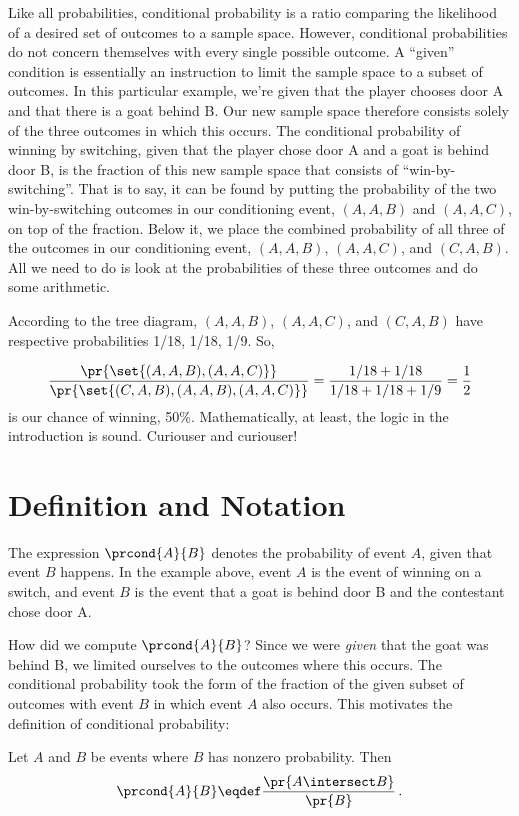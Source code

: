 Like all probabilities, conditional probability is a ratio comparing
the likelihood of a desired set of outcomes to a sample space.
However, conditional probabilities do not concern themselves with
every single possible outcome.  A ``given'' condition is essentially
an instruction to limit the sample space to a subset of outcomes.  In
this particular example, we're given that the player chooses door A
and that there is a goat behind B.  Our new sample space therefore
consists solely of the three outcomes in which this occurs.  The
conditional probability of winning by switching, given that the player
chose door A and a goat is behind door B, is the fraction of this new
sample space that consists of ``win-by-switching''.  That is to say,
it can be found by putting the probability of the two win-by-switching
outcomes in our conditioning event, $(A, A, B)$ and $(A, A, C)$, on
top of the fraction.  Below it, we place the combined probability of
all three of the outcomes in our conditioning event, $(A, A, B)$, $(A,
A, C)$, and $(C, A, B)$.  All we need to do is look at the
probabilities of these three outcomes and do some arithmetic.

According to the tree diagram, $(A, A, B)$, $(A, A, C)$, and $(C, A,
B)$ have respective probabilities 1/18, 1/18, 1/9. So,

\iffalse
A Monty Hall game has a
\[
\frac{1}{18} + \frac{1}{18} + \frac{1}{9} = \frac{2}{9}
\]
chance of ending in one of these outcomes.  This 2/9 fraction is all
we need; we can ignore all other outcomes on the tree.
\fi
\[ 
\frac{\pr{\set{(A, A, B),(A, A, C)}}}{\pr{\set{(C, A, B),(A, A,
    B),(A, A, C)}}} = \frac{1/18 + 1/18}{1/18 + 1/18 + 1/9}=\frac{1}{2}
\]
is our chance of winning, 50\%.  Mathematically, at least, the
logic in the introduction is sound.  Curiouser and curiouser!

\section{Definition and Notation}

The expression $\prcond{A}{B}$ denotes the probability of event $A$,
given that event $B$ happens.  In the example above, event $A$ is the
event of winning on a switch, and event $B$ is the event that a goat
is behind door B and the contestant chose door A.

How did we compute $\prcond{A}{B}$?  Since we were \emph{given} that
the goat was behind B, we limited ourselves to the outcomes where this
occurs.  The conditional probability took the form of the fraction of
the given subset of outcomes with event $B$ in which event $A$ also
occurs.  This motivates the definition of conditional probability:
\begin{definition}\label{LN12:prcond}
Let $A$ and $B$ be events where $B$ has nonzero probability.  Then
\[
\prcond{A}{B} \eqdef \frac{\pr{A \intersect B}}{\pr{B}}\,.
\]
\end{definition}

